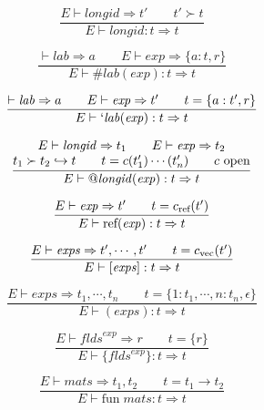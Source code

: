 \documentclass[twoside]{article}
\newcommand{\conarrow}{\hookrightarrow}
\newcommand{\x}[1]{\mathit{#1}}
\newcommand{\f}[1]{\mbox{#1}}
\renewcommand{\c}[1]{c_{\f{\scriptsize #1}}}
\newcommand{\lab}{\x{lab}}
\newcommand{\longid}{\x{longid}}
\renewcommand{\exp}{\x{exp}}
\newcommand{\exps}{\x{exps}}
\newcommand{\flds}{\x{flds}}
\newcommand{\mats}{\x{mats}}
\begin{document}
\begin{equation}
\frac{
E \vdash \longid \Rightarrow t'
\qquad
t' \succ t
}{
E \vdash \longid : t \Rightarrow t
}
\end{equation}

\begin{equation}
\frac{
\vdash \lab \Rightarrow a
\qquad
E \vdash \exp \Rightarrow \{a:t,r\}
}{
E \vdash \#\lab(\exp) : t \Rightarrow t
}
\end{equation}

\begin{equation}
\frac{
\vdash \lab \Rightarrow a
\qquad
E \vdash \exp \Rightarrow t'
\qquad
t = \{a:t',r\}
}{
E \vdash `\lab(\exp) : t \Rightarrow t
}
\end{equation}

\begin{equation}
\frac{
\begin{array}{@{}c@{}}
E \vdash \longid \Rightarrow t_1
\qquad
E \vdash \exp \Rightarrow t_2
\\
t_1 \succ t_2 \conarrow t
\qquad
t = c(t_1')\cdots(t_n')
\qquad
\mbox{$c$ open}
\end{array}
}{
E \vdash @\longid(\exp) : t \Rightarrow t
}
\end{equation}

\begin{equation}
\frac{
E \vdash \exp \Rightarrow t'
\qquad
t = \c{ref}(t')
}{
E \vdash \f{ref}(\exp) : t \Rightarrow t
}
\end{equation}

\begin{equation}
\frac{
E \vdash \exps \Rightarrow t',\cdots,t'
\qquad
t = \c{vec}(t')
}{
E \vdash [\exps] : t \Rightarrow t
}
\end{equation}

\begin{equation}
\frac{
E \vdash \exps \Rightarrow t_1,\cdots,t_n
\qquad
t = \{1:t_1,\cdots,n:t_n,\epsilon\}
}{
E \vdash (\exps) : t \Rightarrow t
}
\end{equation}

\begin{equation}
\frac{
E \vdash \flds^\exp \Rightarrow r
\qquad
t = \{r\}
}{
E \vdash \{\flds^\exp\} : t \Rightarrow t
}
\end{equation}

\begin{equation}
\frac{
E \vdash \mats \Rightarrow t_1,t_2
\qquad
t = t_1 \to t_2
}{
E \vdash \f{fun}\;\mats : t \Rightarrow t
}
\end{equation}
\end{document}
